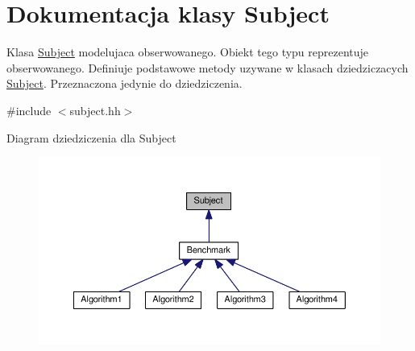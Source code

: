 \hypertarget{class_subject}{\section{Dokumentacja klasy Subject}
\label{class_subject}
}


Klasa \hyperlink{class_subject}{Subject} modelujaca obserwowanego. Obiekt tego typu reprezentuje obserwowanego. Definiuje podstawowe metody uzywane w klasach dziedziczacych \hyperlink{class_subject}{Subject}. Przeznaczona jedynie do dziedziczenia.  




{\ttfamily \#include $<$subject.\-hh$>$}



Diagram dziedziczenia dla Subject
\nopagebreak
\begin{figure}[H]
\begin{center}
\leavevmode
\includegraphics[width=350pt]{class_subject__inherit__graph}
\end{center}
\end{figure}
